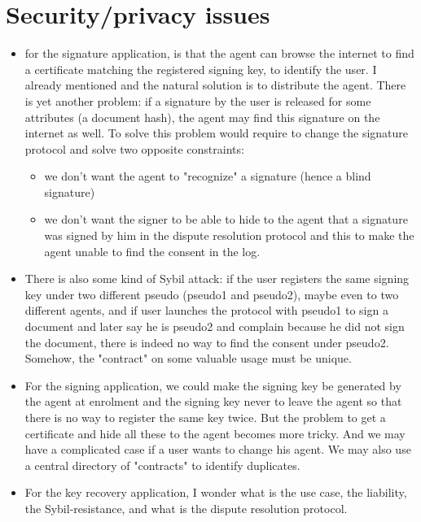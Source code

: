 \section{Security/privacy issues}

\begin{itemize}
	\item  for the signature application, is that the agent can browse the internet to find a certificate matching the registered signing key, to identify the user. I already mentioned and the natural solution is to distribute the agent. There is yet another problem: if a signature by the user is released for some attributes (a document hash), the agent may find this signature on the internet as well. To solve this problem would require to change the signature protocol and solve two opposite constraints:
\begin{itemize}
\item we don't want the agent to "recognize" a signature (hence a blind signature)
\item we don't want the signer to be able to hide to the agent that a signature was signed by him in the dispute resolution protocol and this to make the agent unable to find the consent in the log.
\end{itemize}


\item There is also some kind of Sybil attack: if the user registers the same signing key under two different pseudo (pseudo1 and pseudo2), maybe even to two different agents, and if user launches the protocol with pseudo1 to sign a document and later say he is pseudo2 and complain because he did not sign the document, there is indeed no way to find the consent under pseudo2. Somehow, the "contract" on some valuable usage must be unique.

\item For the signing application, we could make the signing key be generated by the agent at enrolment and the signing key never to leave the agent so that there is no way to register the same key twice. But the problem to get a certificate and hide all these to the agent becomes more tricky. And we may have a complicated case if a user wants to change his agent. We may also use a central directory of "contracts" to identify duplicates.

\item For the key recovery application, I wonder what is the use case, the liability, the Sybil-resistance, and what is the dispute resolution protocol.
\end{itemize}

